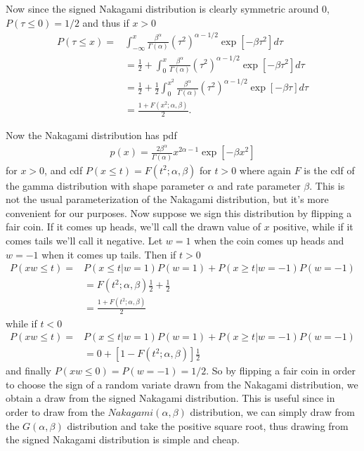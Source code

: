 \documentclass{article}\usepackage[]{graphicx}\usepackage[]{color}
\begin{document}
Now since the signed Nakagami distribution is clearly symmetric around 0, $P(\tau\leq 0)=1/2$ and thus if $x>0$
\begin{align*}
  P(\tau \leq x) = &\int_{-\infty}^x \frac{\beta^\alpha}{\Gamma(\alpha) }(\tau^2)^{\alpha-1/2}\exp\left[-\beta\tau^2\right] d\tau \\
  &= \frac{1}{2} + \int_{0}^x \frac{\beta^\alpha}{\Gamma(\alpha) }(\tau^2)^{\alpha-1/2}\exp\left[-\beta\tau^2\right] d\tau \\
    &=\frac{1}{2} + \frac{1}{2}\int_0^{x^2} \frac{\beta^\alpha}{\Gamma(\alpha) }(\tau^2)^{\alpha-1/2}\exp\left[-\beta \tau\right] d\tau\\
    &= \frac{1 + F(x^2;\alpha,\beta)}{2}.
\end{align*}

Now the Nakagami distribution has pdf
\begin{align*}
  p(x) = \frac{2 \beta^\alpha}{ \Gamma(\alpha)}x^{2\alpha -1}\exp\left[-\beta x^2\right]
\end{align*}
for $x>0$, and cdf $P(x\leq t)=F(t^2;\alpha,\beta)$ for $t>0$ where again $F$ is the cdf of the gamma distribution with shape parameter $\alpha$ and rate parameter $\beta$. This is not the usual parameterization of the Nakagami distribution, but it's more convenient for our purposes. Now suppose we sign this distribution by flipping a fair coin. If it comes up heads, we'll call the drawn value of $x$ positive, while if it comes tails we'll call it negative. Let $w=1$ when the coin comes up heads and $w=-1$ when it comes up tails. Then if $t> 0$
\begin{align*}
  P(xw \leq t) =& P(x\leq t | w=1)P(w=1) + P(x\geq t|w=-1)P(w=-1) \\
  &= F(t^2;\alpha,\beta)\frac{1}{2} + \frac{1}{2}\\
  &=\frac{1+ F(t^2;\alpha,\beta)}{2}
\end{align*}
while if $t<0$
\begin{align*}
  P(xw \leq t) =& P(x\leq t | w=1)P(w=1) + P(x\geq t|w=-1)P(w=-1) \\
  &= 0 + [1-F(t^2;\alpha,\beta)]\frac{1}{2}
\end{align*}
and finally $P(xw\leq 0) = P(w=-1) = 1/2$. So by flipping a fair coin in order to choose the sign of a random variate drawn from the Nakagami distribution, we obtain a draw from the signed Nakagami distribution. This is useful since in order to draw from the $Nakagami(\alpha,\beta)$ distribution, we can simply draw from the $G(\alpha,\beta)$ distribution and take the positive square root, thus drawing from the signed Nakagami distribution is simple and cheap.
\end{document}
